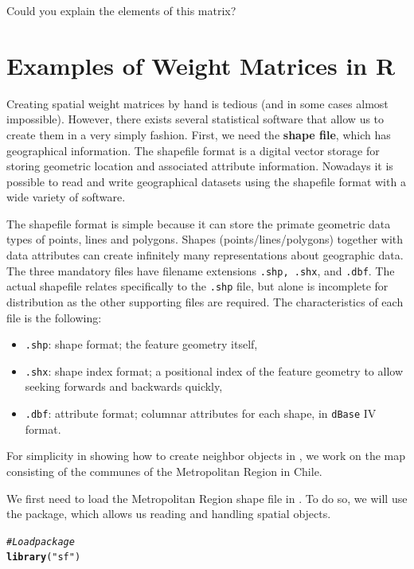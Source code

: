 \documentclass[english,12pt]{book}\usepackage[]{graphicx}\usepackage[]{xcolor}
\makeatletter
\newcommand{\hlstr}[1]{\textcolor[rgb]{0.192,0.494,0.8}{#1}}%
\newcommand{\hlcom}[1]{\textcolor[rgb]{0.678,0.584,0.686}{\textit{#1}}}%
\newcommand{\hlstd}[1]{\textcolor[rgb]{0.345,0.345,0.345}{#1}}%
\newcommand{\hlkwd}[1]{\textcolor[rgb]{0.737,0.353,0.396}{\textbf{#1}}}%
\newenvironment{kframe}{%
 \def\at@end@of@kframe{}%
 \ifinner\ifhmode%
  \def\at@end@of@kframe{\end{minipage}}%
  \begin{minipage}{\columnwidth}%
 \fi\fi%
 \def\FrameCommand##1{\hskip\@totalleftmargin \hskip-\fboxsep
 \colorbox{shadecolor}{##1}\hskip-\fboxsep
     \hskip-\linewidth \hskip-\@totalleftmargin \hskip\columnwidth}%
 \MakeFramed {\advance\hsize-\width
   \@totalleftmargin\z@ \linewidth\hsize
   \@setminipage}}%
 {\par\unskip\endMakeFramed%
 \at@end@of@kframe}
\newenvironment{knitrout}{}{} %
\makeatother
\begin{document}
Could you explain the elements of this matrix?


\section{Examples of Weight Matrices in R}

Creating spatial weight matrices by hand is tedious (and in some cases almost impossible). However, there exists several statistical software that allow us to create them in a very simply fashion.  First, we need the \textbf{shape file}, which has geographical information.  The shapefile format is a digital vector storage for storing geometric location and associated attribute information. Nowadays it is possible to read and write geographical datasets using the shapefile format with a wide variety of software.

The shapefile format is simple because it can store the primate geometric data types of points, lines and polygons. Shapes (points/lines/polygons) together with data attributes can create infinitely many representations about geographic data. The three mandatory files have filename extensions \texttt{.shp, .shx}, and \texttt{.dbf}. The actual shapefile relates specifically to the \texttt{.shp} file, but alone is incomplete for distribution as the other supporting files are required. The characteristics of each file is the following:

\begin{itemize}
  \item \texttt{.shp}: shape format; the feature geometry itself,
  \item \texttt{.shx}: shape index format; a positional index of the feature geometry to allow seeking forwards and backwards quickly,
  \item \texttt{.dbf}: attribute format; columnar attributes for each shape, in \texttt{dBase} IV format. 
\end{itemize}

For simplicity in showing how to create neighbor objects in , we work on the map consisting of the communes of the Metropolitan Region in Chile. 

We first need to load the Metropolitan Region shape file in . To do so, we will use the  package, which allows us reading and handling spatial objects. 

\begin{knitrout}
\color{fgcolor}\begin{kframe}
\begin{alltt}
\hlcom{#Load package}
\hlkwd{library}\hlstd{(}\hlstr{"sf"}\hlstd{)}
\end{alltt}
\end{kframe}
\end{knitrout}
\end{document}

